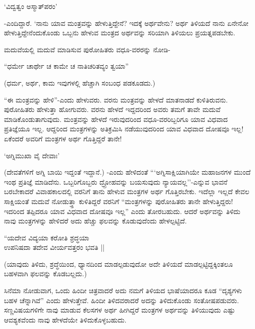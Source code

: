 \begin{shloka}
`ವಿದ್ವತ್ವಂ ಅಸ್ಮಾತ್‌ಪರಂ'
\end{shloka}

-ಎಂದಿದ್ದಾರೆ. `ನಾನು ಯಾವ ಮಂತ್ರವನ್ನು ಹೇಳುತ್ತಿದ್ದೇನೆ? ಇದಕ್ಕೆ ಅರ್ಥವೇನು? ಅರ್ಥ ತಿಳಿಯದೆ ನಾನು ಏನೇನೋ ಹೇಳುತ್ತಿದ್ದೇನೆಂದುಕೊಂಡು ಒಬ್ಬನು ಹೇಳುವ ಮಂತ್ರದ ಅರ್ಥವನ್ನು ಸರಿಯಾಗಿ ತಿಳಿಯಲು ಪ್ರಯತ್ನಪಡಬೇಕು.

ಮದುವೆಯಲ್ಲಿ ಮದುವೆ ಮಾಡಿಸುವ ಪುರೋಹಿತರು ವಧೂ-ವರರನ್ನು ನೋಡಿ-

\begin{shloka}
``ಧರ್ಮೇ ಚಾರ್ಥೇ ಚ ಕಾಮೇ ಚ ನಾತಿಚರಿತವ್ಯಂ ತ್ವಯಾ''
\end{shloka}

(ಧರ್ಮ, ಅರ್ಥ, ಕಾಮ ಇವುಗಳಲ್ಲಿ ಹೆಚ್ಚಾಗಿ ಸಂಬಂಧ ಪಡಕೂಡದು.)

``ಈ ಮಂತ್ರವನ್ನು ಹೇಳಿ''-ಎಂದು ಹೇಳುವರು. ವರನು ಮಂತ್ರವನ್ನು ಹೇಳದೆ ಮಾತನಾಡದೆ ಕುಳಿತಿರುವನು. ಪುರೋಹಿತರು ಹೇಳುತ್ತಾ ಹೋಗುವರು. ವರನು ಹೇಳದೆ ಇದ್ದದರಿಂದ ಅವರು ತಮಗೆ ತಾವೇ ಮದುವೆ ಮಾಡಿಕೊಂಡುತಾಗುವುದು. ಮಂತ್ರವನ್ನು ಹೇಳದೆ ಇರುವುದರಿಂದ ವಧೂ-ವರರಿಬ್ಬರಿಗೂ ಯಾವ ವಿಧವಾದ ಪ್ರತಿಜ್ಞೆಯೂ ಇಲ್ಲ. ಆದ್ದರಿಂದ ಮಂತ್ರಗಳನ್ನು ಅತಿಕ್ರಮಿಸಿ ನಡೆಯುವುದರಿಂದ ಯಾವ ವಿಧವಾದ ದೋಷವೂ ಇಲ್ಲ! ಏಕೆಂದರೆ ಅವರಿಗೆ ಮಂತ್ರಗಳ ಅರ್ಥ ಗೊತ್ತಿದ್ದರೆ ತಾನೇ!

\begin{shloka}
`ಅಗ್ನಿಮುಖಾ ವೈ ದೇವಾಃ'
\end{shloka}

(ದೇವತೆಗಳಿಗೆ ಅಗ್ನಿ ಬಾಯಿ ಇದ್ದಂತೆ ಇದ್ದಾನೆ.) -ಎಂದು ಹೇಳಿದಂತೆ ```ಅಗ್ನಿಸಾಕ್ಷಿಯಾಗಿಯೇ ಮಹಾಜನಗಳ ಮುಂದೆ ಇಂಥ ಪ್ರತಿಜ್ಞೆ ಮಾಡಿದೆನು. ಒಬ್ಬರಿಗೊಬ್ಬರು ದ್ರ್ರೋಹವನ್ನು ಬಯಸುವುದು ನ್ಯಾಯವಲ್ಲ''-ಎನ್ನುವ ಭಾವನೆ ಬರಬೇಕಾದರೆ ವಿವಾಹಕಾಲದಲ್ಲಿ ವರನಿಗೆ ತಾನು ಹೇಳುವ ಮಂತ್ರಗಳ ಅರ್ಥ ಗೊತ್ತಿರಬೇಕು. ಇದೆಲ್ಲಾ ಇಲ್ಲದೆ ಕೇವಲ ಸಾಕ್ಷಿಯಂತೆ ಮದುವೆ ನೋಡುತ್ತ್ತಾ ಕುಳಿತಿದ್ದರೆ ವರನಿಗೆ ``ಮಂತ್ರಗಳನ್ನು ಪುರೋಹಿತರು ತಾನೇ ಹೇಳುತ್ತಿದ್ದರು! ಇದರಿಂದ ತಪ್ಪಿದರೂ ಯಾವ ವಿಧವಾದ ದೋಷವೂ ಇಲ್ಲ'' ಎಂದು ತೋರಬಹುದು. ಆದರೆ ಅರ್ಥವನ್ನು ತಿಳಿದು ನಾವು ಮಂತ್ರಗಳನ್ನು ಹೇಳಿದರೆ ಅದು ಹೆಚ್ಚು ಫಲವನ್ನು ಕೊಡುವುದೆಂದು ಹೇಳಲ್ಪಟ್ಟಿದೆ.

\begin{shloka}
``ಯದೇವ ವಿದ್ಯಯಾ ಕರೋತಿ ಶ್ರದ್ಧಯಾ\\
ಉಪನಿಷದಾ ತದೇವ ವೀರ್ಯವತ್ತರಂ ಭವತಿ ||
\end{shloka}

(ಯಾವುದು ತಿಳಿದು, ಶ್ರದ್ಧೆಯಿಂದ, ಧ್ಯಾನದಿಂದ ಮಾಡಲ್ಪಡುವುದೋ ಅದೇ ತಿಳಿಯದೆ ಮಾಡಲ್ಪಟ್ಟಿದ್ದಕ್ಕಿಂತಲೂ ಬಹಳವಾಗಿ ಫಲವನ್ನು ಕೊಡಬಲ್ಲದು.)

ಸಿನೆಮಾ ನೋಡುವಾಗ, ಒಂದು ಹಿಂದೀ ಚಿತ್ರವಾದರೆ ಅದು ನಮಗೆ ತಿಳಿಯದ ಭಾಷೆಯಾದರೂ ಕೂಡ ``ದೃಶ್ಯಗಳು ಬಹಳ ಚೆನ್ನಾಗಿವೆ'' ಎಂದು ಹೇಳುತ್ತೇವೆ. ಹಿಂದೀ ತಿಳಿದವರಾದರೆ ಅದನ್ನು ತಿಳಿದುಕೊಂಡು ಸಂತೋಷಪಡುವರು. ಸಣ್ಣವಿಷಯಗಳಿಗೇ ನಾವು ಮಾಡುವ ಕೆಲಸಗಳ ಅರ್ಥ ಹೀಗಿದ್ದರೆ ಮಂತ್ರಗಳ ಅರ್ಥವನ್ನು ತಿಳಿಯುವುದು ಎಷ್ಟು ಆವಶ್ಯಕವೆಂದು ನಾವು ಹೇಳದೆಯೇ ತಿಳಿದುಕೊಳ್ಳಬಹುದು.


